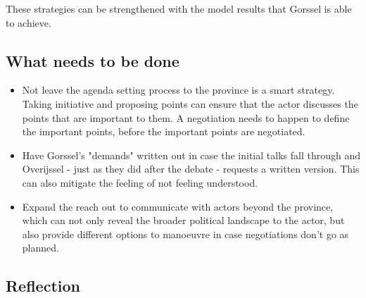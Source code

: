 These strategies can be strengthened with the model results that Gorssel is able to achieve. 
\subsection{What needs to be done}

\begin{itemize}
    \item Not leave the agenda setting process to the province is a smart strategy. Taking initiative and proposing points can ensure that the actor discusses the points that are important to them. A negotiation needs to happen to define the important points, before the important points are negotiated.
    \item Have Gorssel's "demands" written out in case the initial talks fall through and Overijssel - just as they did after the debate - requests a written version. This can also mitigate the feeling of not feeling understood.  
    \item Expand the reach out to communicate with actors beyond the province, which can not only reveal the broader political landscape to the actor, but also provide different options to manoeuvre in case negotiations don't go as planned.
\end{itemize}

\subsection{Reflection}

